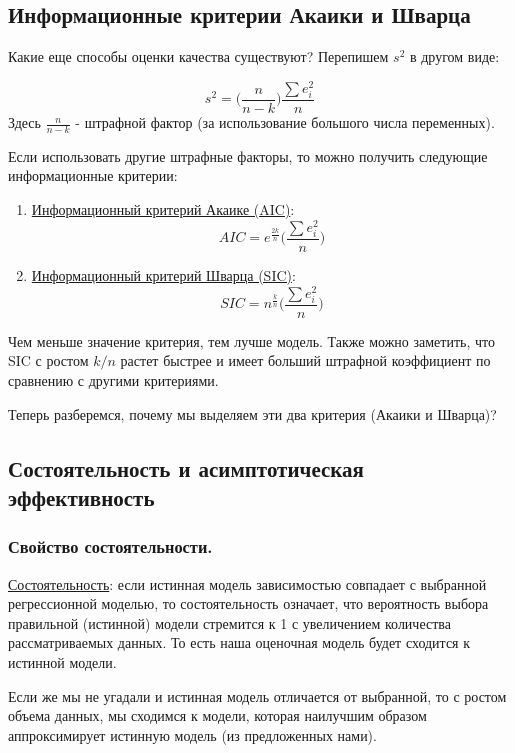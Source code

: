 \documentclass{article}
\begin{document}
\subsection{Информационные критерии Акаики и Шварца} 
Какие еще способы оценки качества существуют? Перепишем $s^2$ в другом виде:

$$s^2 = \big(\frac{n}{n-k}\big) \frac{\sum e^2_i}{n}$$
Здесь $\frac{n}{n-k}$ - штрафной фактор (за использование большого числа переменных). 

Если использовать другие штрафные факторы, то можно получить следующие информационные критерии:

\begin{enumerate}
    \item \underline{Информационный критерий Акаике (AIC)}:
    $$AIC = e^{\frac{2k}{n}} \big(\frac{\sum e^2_i}{n} \big)$$

    \item \underline{Информационный критерий Шварца (SIC)}:
    $$SIC = n^{\frac{k}{n}} \big(\frac{\sum e^2_i}{n} \big)$$
\end{enumerate}

Чем меньше значение критерия, тем лучше модель. Также можно заметить, что SIC с ростом $k/n$ растет быстрее и имеет больший штрафной коэффициент по сравнению с другими критериями.

Теперь разберемся, почему мы выделяем эти два критерия (Акаики и Шварца)? 

\subsection{Состоятельность и асимптотическая эффективность} 

\subsubsection {Свойство состоятельности.}

\underline{Состоятельность}: если истинная модель зависимостью совпадает с выбранной регрессионной моделью, то состоятельность означает, что вероятность выбора правильной (истинной) модели стремится к 1 с увеличением количества рассматриваемых данных. То есть наша оценочная модель будет сходится к истинной модели. 

Если же мы не угадали и истинная модель отличается от выбранной, то с ростом объема данных, мы сходимся к модели, которая наилучшим образом аппроксимирует истинную модель (из предложенных нами). 
\end{document}
